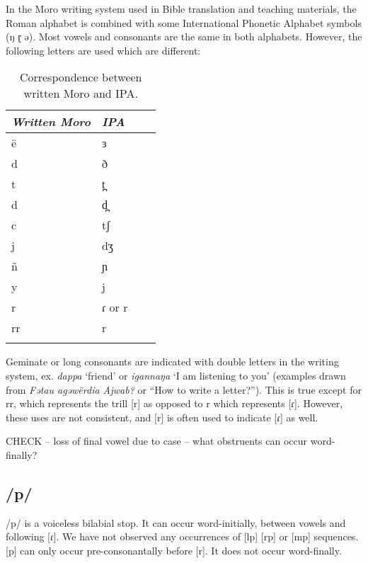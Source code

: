 %


In the Moro writing system used in Bible translation and teaching materials, the Roman alphabet is combined with some International Phonetic Alphabet symbols (ŋ ɽ ə). Most vowels and consonants are the same in both alphabets. However, the following letters are used which are different:

\begin{table}
  \begin{tabular}[t]{llll}
    \lsptoprule
\textit{Written Moro} &		\textit{IPA}\\
\midrule 
	ë	&	ɜ		\\
	d	&	ð		\\	
	t	&	t̪	\\
	d	&	d̪	\\	
	c	&	tʃ	\\
	j	&	dʒ	\\
	ñ	&	ɲ	\\
	y	&	j	\\
	r	&	ɾ or r	\\
	rr	&	r	\\
\lspbottomrule
  \end{tabular}
  \caption{Correspondence between written Moro and IPA.}
  \label{tab:ch2:4}
\end{table}

Geminate or long consonants are indicated with double letters in the writing system, ex. \textit{dappa} ‘friend’ or \textit{igannaŋa} ‘I am listening to you’ (examples drawn from \textit{Fətau agəwërdia Ajwab?} or “How to write a letter?”). This is true except for rr, which represents the trill [r] as opposed to r which represents [ɾ]. However, these uses are not consistent, and [r] is often used to indicate [ɾ] as well. 

CHECK – loss of final vowel due to case – what obstruents can occur word-finally?

\subsection{/p/}
/p/ is a voiceless bilabial stop. It can occur word-initially, between vowels and following [ɾ]. We have not observed any occurrences of [lp] [rp] or [mp] sequences. [p] can only occur pre-consonantally before [r]. It does not occur word-finally.

